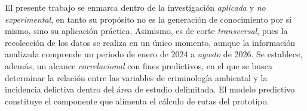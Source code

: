 
El presente trabajo se enmarca dentro de la investigación \textit{aplicada} y \textit{no experimental}, en tanto su propósito no es la generación de conocimiento por sí mismo, sino su aplicación práctica. Asimismo, es de corte \textit{transversal}, pues la recolección de los datos se realiza en un único momento, aunque la información analizada comprende un periodo de enero de 2024 a \textit{agosto} de 2026. Se establece, además, un alcance \textit{correlacional} con fines predictivos, en el que se busca determinar la relación entre las variables de criminología ambiental y la incidencia delictiva dentro del área de estudio delimitada. El modelo predictivo constituye el componente que alimenta el cálculo de rutas del prototipo.
